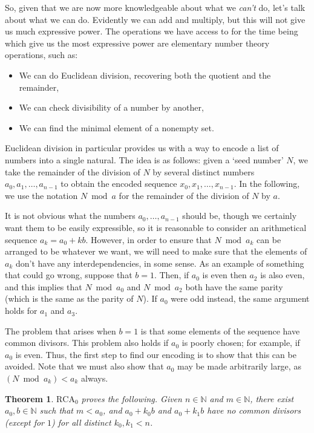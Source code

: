 \documentclass{article}
\newtheorem{theorem}{Theorem}
\theoremstyle{nonumberplain}
\newcommand{\N}{\mathbb{N}}
\newcommand{\RCA}{\mathrm{RCA}}
\begin{document}
So, given that we are now more knowledgeable about what we \emph{can't} do, let's talk about what we can do. Evidently we can add and multiply, but this will not give us much expressive power. The operations we have access to for the time being which give us the most expressive power are elementary number theory operations, such as:
\begin{itemize}
\item We can do Euclidean division, recovering both the quotient and the remainder,
\item We can check divisibility of a number by another,
\item We can find the minimal element of a nonempty set.
\end{itemize}

Euclidean division in particular provides us with a way to encode a list of numbers into a single natural. The idea is as follows: given a `seed number' $N$, we take the remainder of the division of $N$ by several distinct numbers $a_0, a_1, \dots, a_{n-1}$ to obtain the encoded sequence $x_0, x_1, \dots, x_{n-1}$. In the following, we use the notation $N \bmod a$ for the remainder of the division of $N$ by $a$.

It is not obvious what the numbers $a_0, \dots, a_{n-1}$ should be, though we certainly want them to be easily expressible, so it is reasonable to consider an arithmetical sequence $a_k = a_0 + k b$. However, in order to ensure that $N \bmod a_k$ can be arranged to be whatever we want, we will need to make sure that the elements of $a_k$ don't have any interdependencies, in some sense. As an example of something that could go wrong, suppose that $b = 1$. Then, if $a_0$ is even then $a_2$ is also even, and this implies that $N \bmod a_0$ and $N \bmod a_2$ both have the same parity (which is the same as the parity of $N$). If $a_0$ were odd instead, the same argument holds for $a_1$ and $a_3$.

The problem that arises when $b = 1$ is that some elements of the sequence have common divisors. This problem also holds if $a_0$ is poorly chosen; for example, if $a_0$ is even. Thus, the first step to find our encoding is to show that this can be avoided. Note that we must also show that $a_0$ may be made arbitrarily large, as $(N \bmod a_k) < a_k$ always.

\begin{theorem}\label{thm:1}
$\RCA_0$ proves the following. Given $n \in \N$ and $m \in \N$, there exist $a_0, b \in \N$ such that $m < a_0$, and $a_0 + k_0 b$ and $a_0 + k_1 b$ have no common divisors (except for $1$) for all distinct $k_0, k_1 < n$.
\end{theorem}
\end{document}
